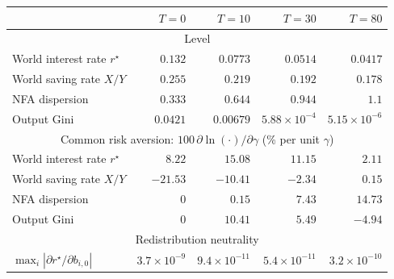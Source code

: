\begin{tabular}{lrrrr}
\toprule
 & $T = 0$ & $T = 10$ & $T = 30$ & $T = 80$ \\
\midrule
\multicolumn{5}{c}{Level} \\
\midrule
World interest rate $r^{\star}$ & $0.132$ & $0.0773$ & $0.0514$ & $0.0417$ \\
World saving rate $X/Y$ & $0.255$ & $0.219$ & $0.192$ & $0.178$ \\
NFA dispersion & $0.333$ & $0.644$ & $0.944$ & $1.1$ \\
Output Gini & $0.0421$ & $0.00679$ & $5.88 \times 10^{-4}$ & $5.15 \times 10^{-6}$ \\
\midrule
\multicolumn{5}{c}{Common risk aversion: $100\,\partial \ln(\cdot)/\partial\gamma$ (\% per unit $\gamma$)} \\
\midrule
World interest rate $r^{\star}$ & $8.22$ & $15.08$ & $11.15$ & $2.11$ \\
World saving rate $X/Y$ & $-21.53$ & $-10.41$ & $-2.34$ & $0.15$ \\
NFA dispersion & $0$ & $0.15$ & $7.43$ & $14.73$ \\
Output Gini & $0$ & $10.41$ & $5.49$ & $-4.94$ \\
\midrule
\multicolumn{5}{c}{Redistribution neutrality} \\
\midrule
$\max_i |\partial r^{\star}/\partial b_{i,0}|$ & $3.7 \times 10^{-9}$ & $9.4 \times 10^{-11}$ & $5.4 \times 10^{-11}$ & $3.2 \times 10^{-10}$ \\
\bottomrule
\end{tabular}
